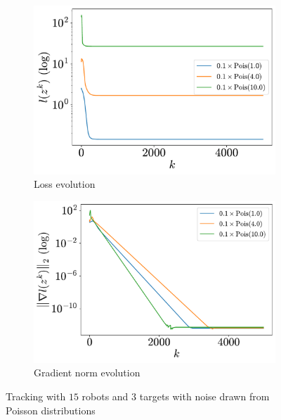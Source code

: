 \documentclass[a4paper,11pt,oneside]{book}
\begin{document}
\begin{figure}[tb!]
      \centering
      \begin{subfigure}[t]{0.46\linewidth}
            \centering
            \includegraphics[width=\linewidth]{./figs/tracking/poisson/loss.pdf} 
            \caption{Loss evolution}
      \end{subfigure}
      \hfill
      \begin{subfigure}[t]{0.46\linewidth}
            \centering
            \includegraphics[width=\linewidth]{./figs/tracking/poisson/gradient.pdf} 
            \caption{Gradient norm evolution}
      \end{subfigure}
      \caption{Tracking with $15$ robots and $3$ targets with noise drawn from Poisson distributions}
      \label{fig:tracking_poisson_15_3}
\end{figure}
\end{document}
